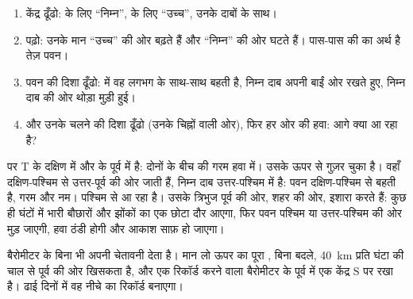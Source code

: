 \begin{method}[मौसम मानचित्र पढ़ना]
\begin{enumerate}
  \item केंद्र ढूँढो:  के लिए ``निम्न'',  के लिए ``उच्च'', उनके
        दाबों के साथ।
  \item {} पढ़ो: उनके मान ``उच्च'' की ओर बढ़ते हैं और ``निम्न'' की ओर घटते
        हैं। पास-पास की  का अर्थ है तेज़ पवन।
  \item पवन की दिशा ढूँढो:  में वह लगभग  के साथ-साथ बहती है,
        निम्न दाब अपनी बाईं ओर रखते हुए, निम्न दाब की ओर थोड़ा
        मुड़ी हुई।
  \item {} और उनके चलने की दिशा ढूँढो (उनके चिह्नों वाली ओर), फिर हर ओर की हवा:
        आगे क्या आ रहा है?
\end{enumerate}
\end{method}

\begin{example}[शहर T का मौसम]
 पर T  के दक्षिण में और  के पूर्व में है: दोनों 
के बीच की गरम हवा में।  उसके ऊपर से गुज़र चुका है। वहाँ 
दक्षिण-पश्चिम से उत्तर-पूर्व की ओर जाती हैं, निम्न दाब उत्तर-पश्चिम में है: पवन
दक्षिण-पश्चिम से बहती है, गरम और नम।  पश्चिम से आ रहा है। उसके त्रिभुज पूर्व
की ओर, शहर की ओर, इशारा करते हैं: कुछ ही घंटों में भारी बौछारों और झोंकों का एक छोटा
दौर आएगा, फिर पवन पश्चिम या उत्तर-पश्चिम की ओर मुड़ जाएगी, हवा ठंडी होगी और आकाश साफ़
हो जाएगा।
\end{example}

बैरोमीटर  के बिना भी अपनी चेतावनी देता है। मान लो ऊपर का पूरा , बिना
बदले, \qty{40}{km} प्रति घंटा की चाल से पूर्व की ओर खिसकता है, और एक रिकॉर्ड करने
वाला बैरोमीटर  के पूर्व में एक केंद्र S पर रखा है। ढाई दिनों में वह नीचे का
रिकॉर्ड बनाएगा।

